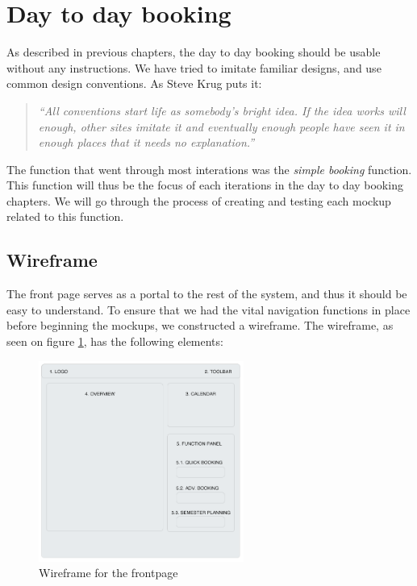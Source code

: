 \section{Day to day booking}
\label{sec:day_to_day_booking_ui}
As described in previous chapters, the day to day booking should be usable without any instructions. We have tried to imitate familiar designs, and use common design conventions. As Steve Krug puts it\cite{steve}: 
\begin{quotation}
\emph{``All conventions start life as somebody's bright idea. If the idea works will enough, other sites imitate it and eventually enough people have seen it in enough places that it needs no explanation.''}
\end{quotation}
The function that went through most interations was the \emph{simple booking} function. This function will thus be the focus of each iterations in the day to day booking chapters. We will go through the process of creating and testing each mockup related to this function.\\
\subsection{Wireframe}
\label{subsec:wireframe}
The front page serves as a portal to the rest of the system, and thus it should be easy to understand. To ensure that we had the vital navigation functions in place before beginning the mockups, we constructed a wireframe\cite{garrett}. The wireframe, as seen on figure \ref{fig:wireframe_frontpage}, has the following elements:

\begin{figure}[htb]
\begin{center}
\leavevmode
\includegraphics[width=0.6\textwidth]{images/wireframe1}
\end{center}
\caption{Wireframe for the frontpage}
\label{fig:wireframe_frontpage}
\end{figure}

